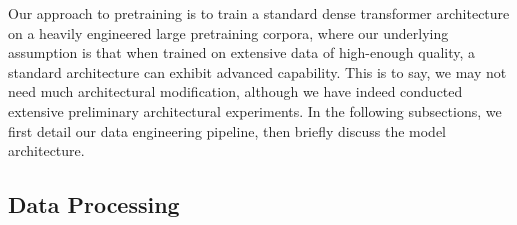 



Our approach to pretraining is to train a standard dense transformer architecture on a heavily engineered large pretraining corpora, where our underlying assumption is that when trained on extensive data of high-enough quality, a standard architecture can exhibit advanced capability. 
This is to say, we may not need much architectural modification, although we have indeed conducted extensive preliminary architectural experiments. 
In the following subsections, we first detail our data engineering pipeline, then briefly discuss the model architecture. 

\subsection{Data Processing}




